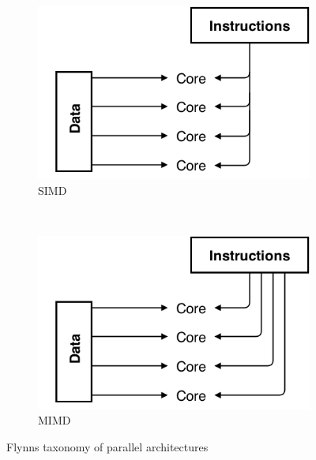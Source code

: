 \documentclass[10pt,a4paper]{report}
\begin{document}
\begin{figure}
        \begin{subfigure}[b]{0.48\textwidth}
                \includegraphics[width=\textwidth]{SIMD}
                \caption{SIMD}
                \label{fig:SIMD}
        \end{subfigure}
        ~
        \begin{subfigure}[b]{0.48\textwidth}
                \includegraphics[width=\textwidth]{MIMD}
                \caption{MIMD}
                \label{fig:MIMD}
        \end{subfigure}
        \caption{Flynns taxonomy of parallel architectures\cite{introduction_hpc_hager}}\label{fig:flynn_taxonomy}
\end{figure}

\newpage
\end{document}
